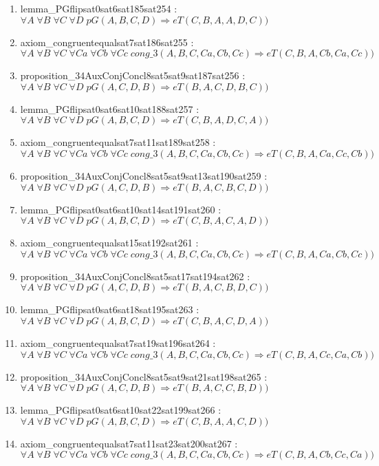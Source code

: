 \documentclass{article}
\begin{document}
\begin{enumerate}
\item lemma\_PGflipsat0sat6sat185sat254 : $\forall A\;\forall B\;\forall C\;\forall D\;pG(A, B, C, D) \Rightarrow eT(C, B, A, A, D, C))$
\item axiom\_congruentequalsat7sat186sat255 : $\forall A\;\forall B\;\forall C\;\forall Ca\;\forall Cb\;\forall Cc\;cong\_3(A, B, C, Ca, Cb, Cc) \Rightarrow eT(C, B, A, Cb, Ca, Cc))$
\item proposition\_34AuxConjConcl8sat5sat9sat187sat256 : $\forall A\;\forall B\;\forall C\;\forall D\;pG(A, C, D, B) \Rightarrow eT(B, A, C, D, B, C))$
\item lemma\_PGflipsat0sat6sat10sat188sat257 : $\forall A\;\forall B\;\forall C\;\forall D\;pG(A, B, C, D) \Rightarrow eT(C, B, A, D, C, A))$
\item axiom\_congruentequalsat7sat11sat189sat258 : $\forall A\;\forall B\;\forall C\;\forall Ca\;\forall Cb\;\forall Cc\;cong\_3(A, B, C, Ca, Cb, Cc) \Rightarrow eT(C, B, A, Ca, Cc, Cb))$
\item proposition\_34AuxConjConcl8sat5sat9sat13sat190sat259 : $\forall A\;\forall B\;\forall C\;\forall D\;pG(A, C, D, B) \Rightarrow eT(B, A, C, B, C, D))$
\item lemma\_PGflipsat0sat6sat10sat14sat191sat260 : $\forall A\;\forall B\;\forall C\;\forall D\;pG(A, B, C, D) \Rightarrow eT(C, B, A, C, A, D))$
\item axiom\_congruentequalsat15sat192sat261 : $\forall A\;\forall B\;\forall C\;\forall Ca\;\forall Cb\;\forall Cc\;cong\_3(A, B, C, Ca, Cb, Cc) \Rightarrow eT(C, B, A, Ca, Cb, Cc))$
\item proposition\_34AuxConjConcl8sat5sat17sat194sat262 : $\forall A\;\forall B\;\forall C\;\forall D\;pG(A, C, D, B) \Rightarrow eT(B, A, C, B, D, C))$
\item lemma\_PGflipsat0sat6sat18sat195sat263 : $\forall A\;\forall B\;\forall C\;\forall D\;pG(A, B, C, D) \Rightarrow eT(C, B, A, C, D, A))$
\item axiom\_congruentequalsat7sat19sat196sat264 : $\forall A\;\forall B\;\forall C\;\forall Ca\;\forall Cb\;\forall Cc\;cong\_3(A, B, C, Ca, Cb, Cc) \Rightarrow eT(C, B, A, Cc, Ca, Cb))$
\item proposition\_34AuxConjConcl8sat5sat9sat21sat198sat265 : $\forall A\;\forall B\;\forall C\;\forall D\;pG(A, C, D, B) \Rightarrow eT(B, A, C, C, B, D))$
\item lemma\_PGflipsat0sat6sat10sat22sat199sat266 : $\forall A\;\forall B\;\forall C\;\forall D\;pG(A, B, C, D) \Rightarrow eT(C, B, A, A, C, D))$
\item axiom\_congruentequalsat7sat11sat23sat200sat267 : $\forall A\;\forall B\;\forall C\;\forall Ca\;\forall Cb\;\forall Cc\;cong\_3(A, B, C, Ca, Cb, Cc) \Rightarrow eT(C, B, A, Cb, Cc, Ca))$

\end{enumerate}
\end{document}
